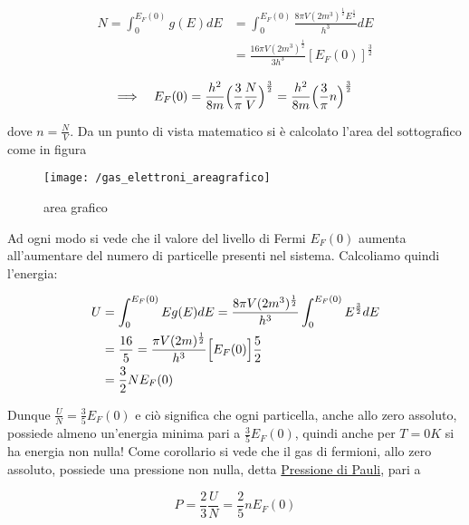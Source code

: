 \begin{equation}
\begin{split}
N = \int_0^{E_F(0)} g(E)dE & =  \int_0^{E_F(0)} \frac{8 \pi V (2m^3)^{\frac{1}{2}} E^{\frac{1}{2}}}{h^3} dE \\
& = \frac{16 \pi V (2m^3)^{\frac{1}{2}} }{3 h^3} [E_F(0)]^{\frac{3}{2}}
\end{split}
\end{equation}

\begin{equation}
\Longrightarrow \quad E_F(0) = \frac{ h^2}{8m } \Bigl(  \frac{ 3}{\pi } \frac{ N}{V }  \Bigr)^{ \frac{ 3}{ 2} } = \frac{ h^2}{8m } \Bigl(  \frac{ 3}{\pi } n \Bigr)^{ \frac{ 3}{ 2} }
\end{equation}

dove $n = \frac{ N}{V }$.
Da un punto di vista matematico si è calcolato l'area del sottografico come in figura

\begin{figure}[h]
\centering
\texttt{[image: /gas\_elettroni\_areagrafico]}
\caption{area grafico}
\end{figure}

Ad ogni modo si vede che il valore del livello di Fermi $E_F(0)$ aumenta all'aumentare del numero di particelle presenti nel sistema.
Calcoliamo quindi l'energia:

\begin{equation}
\begin{split}
U & = \int_0^{E_F(0)} E g(E)dE = \frac{8 \pi V (2m^3)^{\frac{1}{2}} }{h^3} \int_0^{E_F(0)} E^{ \frac{ 3}{2 } } dE \\
& = \frac{ 16}{5 } = \frac{ \pi V (2m)^{ \frac{ 1}{2 } }}{h^{ 3 } } \Bigl[ E_F(0) \Bigr]\frac{ 5}{2} \\
& = \frac{ 3}{2} N E_F(0)
\end{split}
\end{equation}


Dunque $\frac{ U}{N} = \frac{ 3}{5} E_F(0)$ e ciò significa che ogni particella, anche allo zero assoluto, 
possiede almeno un'energia minima pari a $\frac{ 3}{5} E_F(0)$, quindi anche per $T = 0 K $ si ha energia non nulla!
Come corollario si vede che il gas di fermioni, allo zero assoluto, possiede una pressione non nulla, detta
\underline{Pressione di Pauli}, pari a 

\begin{equation}
P = \frac{ 2}{3} \frac{ U}{N} = \frac{ 2}{5} n E_F(0)
\end{equation}

